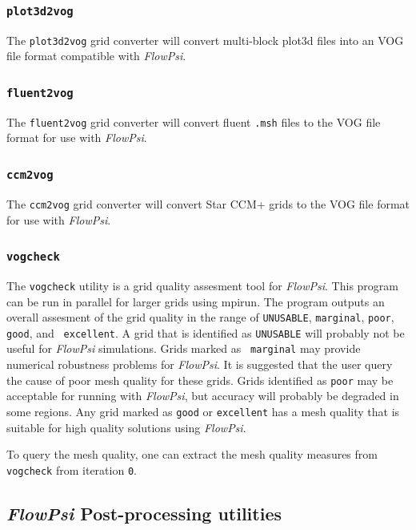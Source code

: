 \documentclass{article}
\begin{document}
\subsubsection{\tt plot3d2vog}

The {\tt plot3d2vog} grid converter will convert multi-block plot3d files into an VOG file format compatible with {\em FlowPsi}. 

\subsubsection{\tt fluent2vog}

The {\tt fluent2vog} grid converter will convert fluent {\tt .msh} files to the VOG file format for use with {\em FlowPsi}.

\subsubsection{\tt ccm2vog}

The {\tt ccm2vog} grid converter will convert Star CCM+ grids to the VOG file format for use with {\em FlowPsi}.


\subsubsection{\tt vogcheck}

The {\tt vogcheck} utility is a grid quality assesment tool for {\em FlowPsi}.
This program can be run in parallel for larger grids using mpirun.
The program outputs an overall assesment of the grid quality in the
range of {\tt UNUSABLE}, {\tt marginal}, {\tt poor}, {\tt good}, and {\tt
  excellent}.  A grid that is identified as {\tt UNUSABLE} will
probably not be useful for {\em FlowPsi} simulations.  Grids marked as {\tt
  marginal} may provide numerical robustness problems for {\em FlowPsi}.  It is
suggested that the user query the cause of poor mesh quality for these
grids.  Grids identified as {\tt poor} may be acceptable for
running with {\em FlowPsi}, but accuracy will probably be degraded in some
regions.  Any grid marked as {\tt good} or {\tt excellent} has a mesh
quality that is suitable for high quality solutions using {\em FlowPsi}.

To query the mesh quality, one can extract the mesh quality measures
from {\tt vogcheck} from iteration {\tt 0}.


\subsection{{\em FlowPsi} Post-processing utilities}
\end{document}
